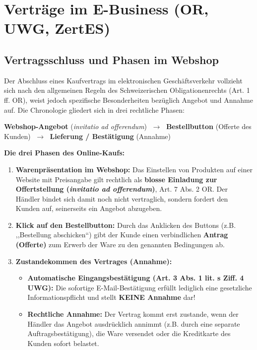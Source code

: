 \section{Verträge im E-Business (OR, UWG, ZertES)}

\subsection{Vertragsschluss und Phasen im Webshop}

Der Abschluss eines Kaufvertrags im elektronischen Geschäftsverkehr vollzieht sich nach den allgemeinen Regeln des Schweizerischen Obligationenrechts (Art. 1 ff. OR), weist jedoch spezifische Besonderheiten bezüglich Angebot und Annahme auf. Die Chronologie gliedert sich in drei rechtliche Phasen:
\begin{center}
    \textbf{Webshop-Angebot} (\textit{invitatio ad offerendum}) $\;\longrightarrow\;$ \textbf{Bestellbutton} (Offerte des Kunden) $\;\longrightarrow\;$ \textbf{Lieferung / Bestätigung} (Annahme)
\end{center}

\begin{definition}
    \textbf{Die drei Phasen des Online-Kaufs:}
    \begin{enumerate}
        \item \textbf{Warenpräsentation im Webshop:} Das Einstellen von Produkten auf einer Website mit Preisangabe gilt rechtlich als \textbf{blosse Einladung zur Offertstellung (\textit{invitatio ad offerendum})}, Art. 7 Abs. 2 OR. Der Händler bindet sich damit noch nicht vertraglich, sondern fordert den Kunden auf, seinerseits ein Angebot abzugeben.
        \item \textbf{Klick auf den Bestellbutton:} Durch das Anklicken des Buttons (z.B. ,,Bestellung abschicken``) gibt der Kunde einen verbindlichen \textbf{Antrag (Offerte)} zum Erwerb der Ware zu den genannten Bedingungen ab.
        \item \textbf{Zustandekommen des Vertrages (Annahme):}
        \begin{itemize}
            \item \textbf{Automatische Eingangsbestätigung (Art. 3 Abs. 1 lit. s Ziff. 4 UWG):} Die sofortige E-Mail-Bestätigung erfüllt lediglich eine gesetzliche Informationspflicht und stellt \textbf{KEINE Annahme} dar!
            \item \textbf{Rechtliche Annahme:} Der Vertrag kommt erst zustande, wenn der Händler das Angebot ausdrücklich annimmt (z.B. durch eine separate Auftragsbestätigung), die Ware versendet oder die Kreditkarte des Kunden sofort belastet.
        \end{itemize}
    \end{enumerate}
\end{definition}

